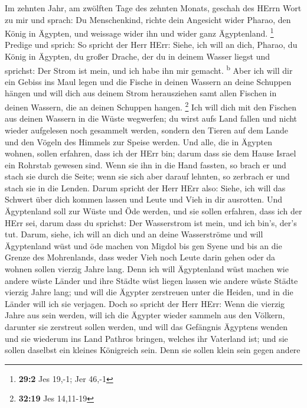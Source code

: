  Im zehnten Jahr, am zwölften Tage des zehnten Monats,
geschah des HErrn Wort zu mir und sprach:  Du
Menschenkind, richte dein Angesicht wider Pharao, den König in Ägypten,
und weissage wider ihn und wider ganz Ägyptenland. \footnote{\textbf{29:2}
  Jes 19,-1; Jer 46,-1}  Predige und sprich: So spricht
der Herr HErr: Siehe, ich will an dich, Pharao, du König in Ägypten, du
großer Drache, der du in deinem Wasser liegst und sprichst: Der Strom
ist mein, und ich habe ihn mir gemacht. \textsuperscript{b}
 Aber ich will dir ein Gebiss ins Maul legen und die
Fische in deinen Wassern an deine Schuppen hängen und will dich aus
deinem Strom herausziehen samt allen Fischen in deinen Wassern, die an
deinen Schuppen hangen. \footnote{\textbf{32:19} Jes 14,11-19}
 Ich will dich mit den Fischen aus deinen Wassern in die
Wüste wegwerfen; du wirst aufs Land fallen und nicht wieder aufgelesen
noch gesammelt werden, sondern den Tieren auf dem Lande und den Vögeln
des Himmels zur Speise werden.  Und alle, die in Ägypten
wohnen, sollen erfahren, dass ich der HErr bin; darum dass sie dem Hause
Israel ein Rohrstab gewesen sind.  Wenn sie ihn in die
Hand fassten, so brach er und stach sie durch die Seite; wenn sie sich
aber darauf lehnten, so zerbrach er und stach sie in die Lenden.
 Darum spricht der Herr HErr also: Siehe, ich will das
Schwert über dich kommen lassen und Leute und Vieh in dir ausrotten.
 Und Ägyptenland soll zur Wüste und Öde werden, und sie
sollen erfahren, dass ich der HErr sei, darum dass du sprichst: Der
Wasserstrom ist mein, und ich bin's, der's tut.  Darum,
siehe, ich will an dich und an deine Wasserströme und will Ägyptenland
wüst und öde machen von Migdol bis gen Syene und bis an die Grenze des
Mohrenlands,  dass weder Vieh noch Leute darin gehen oder
da wohnen sollen vierzig Jahre lang.  Denn ich will
Ägyptenland wüst machen wie andere wüste Länder und ihre Städte wüst
liegen lassen wie andere wüste Städte vierzig Jahre lang; und will die
Ägypter zerstreuen unter die Heiden, und in die Länder will ich sie
verjagen.  Doch so spricht der Herr HErr: Wenn die
vierzig Jahre aus sein werden, will ich die Ägypter wieder sammeln aus
den Völkern, darunter sie zerstreut sollen werden,  und
will das Gefängnis Ägyptens wenden und sie wiederum ins Land Pathros
bringen, welches ihr Vaterland ist; und sie sollen daselbst ein kleines
Königreich sein.  Denn sie sollen klein sein gegen andere
